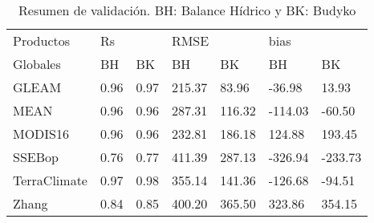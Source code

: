 \begin{table}[hbt]
\caption{Resumen de validación. BH: Balance Hídrico y BK: Budyko}
\label{tab:Table_r_rmse_bias}
\centering
\begin{tabular}{lllllll}
\hline
Productos    & \multicolumn{2}{l}{Rs} & \multicolumn{2}{l}{RMSE} & \multicolumn{2}{l}{bias} \\
Globales     & BH             & BK             & BH                   & BK                  & BH          & BK         \\  \hline
GLEAM        & 0.96           & 0.97           & 215.37               & 83.96               & -36.98      & 13.93      \\
MEAN         & 0.96           & 0.96           & 287.31               & 116.32              & -114.03     & -60.50     \\
MODIS16      & 0.96           & 0.96           & 232.81               & 186.18              & 124.88      & 193.45     \\
SSEBop       & 0.76           & 0.77           & 411.39               & 287.13              & -326.94     & -233.73    \\
TerraClimate & 0.97           & 0.98           & 355.14               & 141.36              & -126.68     & -94.51     \\
Zhang        & 0.84           & 0.85           & 400.20               & 365.50              & 323.86      & 354.15 \\ \hline    
\end{tabular}
\end{table}